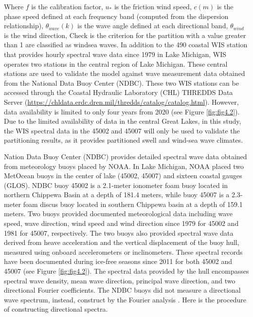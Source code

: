 Where $f$ is the calibration factor,  $u_*$ is the friction wind speed, $c(m)$
is the phase speed defined at each frequency band (computed from the dispersion
relationship), $\theta_{wave}(k)$ is the wave angle defined at each directional
band, $\theta_{wind}$ is the wind direction, Check  is the criterion for the
partition with a value greater than 1 are classified as windsea waves. In
addition to the 490 coastal WIS station that provides hourly spectral wave data
since 1979 in Lake Michigan, WIS operates two stations in the central region of
Lake Michigan.  These central stations are used to validate the model against
wave measurement data obtained from the National Data Buoy Center (NDBC). These
two WIS stations can be accessed through the Coastal Hydraulic Laboratory (CHL)
THREDDS Data Server
(\url{https://chldata.erdc.dren.mil/thredds/catalog/catalog.html}). However,
data availability is limited to only four years from 2020 (see Figure
\ref{fig:fig4.2}). Due to the limited availability of data in the central Great
Lakes, in this study, the WIS spectral data in the 45002 and 45007 will only be
used to validate the partitioning results, as it provides partitioned swell and
wind-sea wave climates.

Nation Data Buoy Center (NDBC) provides detailed spectral wave data obtained
from meteorology buoys placed by NOAA. In Lake Michigan, NOAA placed two
MetOcean buoys in the center of lake (45002, 45007) and sixteen coastal gauges
(GLOS). NDBC buoy 45002 is a 2.1-meter ionometer foam buoy located in northern
Chippewa Basin at a depth of 181.4 meters, while buoy 45007 is a 2.3-meter foam
discus buoy located in southern Chippewa basin at a depth of 159.1 meters. Two
buoys provided documented meteorological data including wave speed, wave
direction, wind speed and wind direction since 1979 for 45002 and 1981 for
45007, respectively. The two buoys also provided spectral wave data derived from
heave acceleration and the vertical displacement of the buoy hull, measured
using onboard accelerometers or inclinometers. These spectral records have been
documented during ice-free seasons since 2011 for both 45002 and 45007 (see
Figure \ref{fig:fig4.2}). The spectral data provided by the hull encompasses
spectral wave density, mean wave direction, principal wave direction, and two
directional Fourier coefficients. The NDBC buoys did not measure a directional
wave spectrum, instead, construct by the Fourier analysis
\citep{longuet-higgins_observations_1961}. Here is the procedure of constructing
directional spectra.

